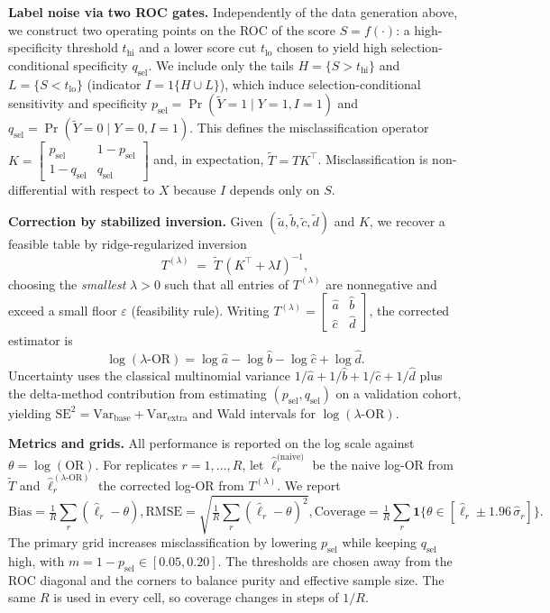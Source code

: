 \documentclass[lineno]{biometrika}
\begin{document}
\textbf{Label noise via two ROC gates.}
Independently of the data generation above, we construct two operating points on the ROC of the score $S=f(\cdot)$: a high-specificity threshold $t_{\mathrm{hi}}$ and a lower score cut $t_{\mathrm{lo}}$ chosen to yield high selection-conditional specificity $q_{\mathrm{sel}}$. We include only the tails $H=\{S>t_{\mathrm{hi}}\}$ and $L=\{S<t_{\mathrm{lo}}\}$ (indicator $I=1\{H\cup L\}$), which induce selection-conditional sensitivity and specificity
$p_{\mathrm{sel}}=\Pr(\tilde Y=1\mid Y=1,I=1)$ and $q_{\mathrm{sel}}=\Pr(\tilde Y=0\mid Y=0,I=1)$.
This defines the misclassification operator
$K=\begin{bmatrix} p_{\mathrm{sel}} & 1-p_{\mathrm{sel}}\\[2pt] 1-q_{\mathrm{sel}} & q_{\mathrm{sel}}\end{bmatrix}$ and, in expectation, $\tilde T = T K^{\!\top}$.
Misclassification is non-differential with respect to $X$ because $I$ depends only on $S$.

\textbf{Correction by stabilized inversion.}
Given $(\tilde a,\tilde b,\tilde c,\tilde d)$ and $K$, we recover a feasible table by ridge-regularized inversion
\[
T^{(\lambda)} \;=\; \tilde T\,(K^{\!\top}+\lambda I)^{-1},
\]
choosing the \emph{smallest} $\lambda>0$ such that all entries of $T^{(\lambda)}$ are nonnegative and exceed a small floor $\varepsilon$ (feasibility rule). Writing $T^{(\lambda)}=\begin{bmatrix}\hat a&\hat b\\ \hat c&\hat d\end{bmatrix}$, the corrected estimator is
\[
\log(\lambda\text{-OR})=\log\hat a-\log\hat b-\log\hat c+\log\hat d.
\]
Uncertainty uses the classical multinomial variance $1/\hat a+1/\hat b+1/\hat c+1/\hat d$ plus the delta-method contribution from estimating $(p_{\mathrm{sel}},q_{\mathrm{sel}})$ on a validation cohort, yielding $\mathrm{SE}^2=\mathrm{Var}_{\text{base}}+\mathrm{Var}_{\text{extra}}$ and Wald intervals for $\log(\lambda\text{-OR})$.

\textbf{Metrics and grids.}
All performance is reported on the log scale against $\theta=\log(\mathrm{OR})$. For replicates $r=1,\ldots,R$, let $\widehat\ell_{r}^{\text{(naive)}}$ be the naive log-OR from $\tilde T$ and $\widehat\ell_{r}^{(\lambda\text{-OR})}$ the corrected log-OR from $T^{(\lambda)}$. We report
\[
\mathrm{Bias}=\tfrac1R\sum_{r}(\widehat\ell_r-\theta),
\mathrm{RMSE}=\sqrt{\tfrac1R\sum_{r}(\widehat\ell_r-\theta)^2},
\mathrm{Coverage}=\tfrac1R\sum_{r}\mathbf{1}\{\theta\in[\widehat\ell_r\pm1.96\,\widehat\sigma_r]\}.
\]
The primary grid increases misclassification by lowering $p_{\mathrm{sel}}$ while keeping $q_{\mathrm{sel}}$ high, with $m=1-p_{\mathrm{sel}}\in [0.05,0.20]$. The thresholds are chosen away from the ROC diagonal and the corners to balance purity and effective sample size. The same $R$ is used in every cell, so coverage changes in steps of $1/R$.
\end{document}
